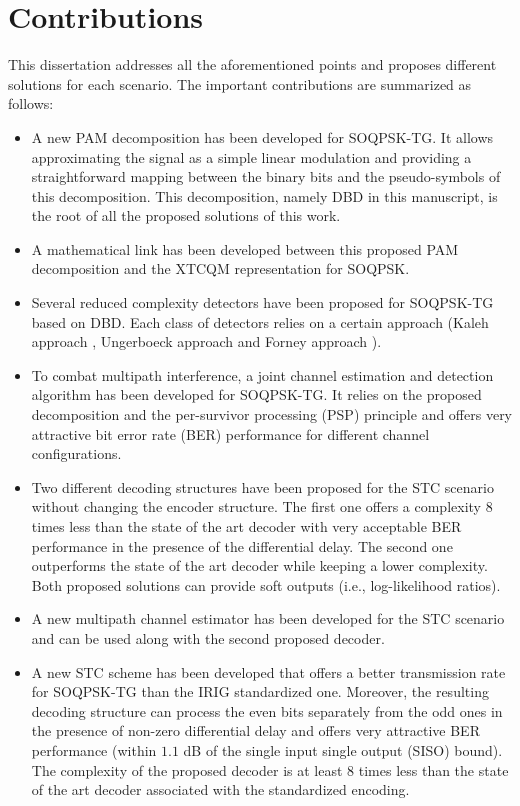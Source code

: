 \section*{Contributions}
This dissertation addresses all the aforementioned points and proposes different solutions for each scenario. The important contributions are summarized as follows:
\begin{itemize}
\item A new PAM decomposition has been developed for SOQPSK-TG. It allows approximating the signal as a simple linear modulation and providing a straightforward mapping between the binary bits and the pseudo-symbols of this decomposition. This decomposition, namely DBD in this manuscript, is the root of all the proposed solutions of this work. 
\item A mathematical link has been developed between this proposed PAM decomposition and the XTCQM representation for SOQPSK.  
\item Several reduced complexity detectors have been proposed for SOQPSK-TG based on DBD. Each class of detectors relies on a certain approach (Kaleh approach \cite{simple_coherent}, Ungerboeck approach \cite{mlse_pam} and Forney approach \cite{forney_mlse}).
\item To combat multipath interference, a joint channel estimation and detection algorithm has been developed for SOQPSK-TG. It relies on the proposed decomposition and the per-survivor processing (PSP) principle \cite{polydoros_psp} and offers very attractive bit error rate (BER) performance for different channel configurations.
\item Two different decoding structures have been proposed for the STC scenario without changing the encoder structure. The first one offers a complexity $8$ times less than the state of the art decoder with very acceptable BER performance in the presence of the differential delay. The second one outperforms the state of the art decoder while keeping a lower complexity. Both proposed solutions can provide soft outputs (i.e., log-likelihood ratios).    
\item A new multipath channel estimator has been developed for the STC scenario and can be used along with the second proposed decoder. 
\item A new STC scheme has been developed that offers a better transmission rate for SOQPSK-TG than the IRIG standardized one. Moreover, the resulting decoding structure can process the even bits separately from the odd ones in the presence of non-zero differential delay and offers very attractive BER performance (within $1.1$ dB of the single input single output (SISO) bound). The complexity of the proposed decoder is at least $8$ times less than the state of the art decoder associated with the standardized encoding.   
\end{itemize}

